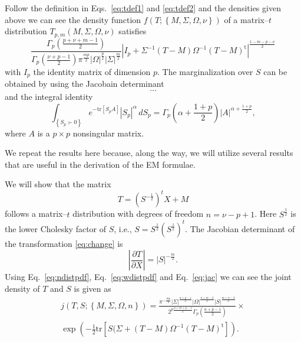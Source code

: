 \documentclass[english,listof=totoc]{scrartcl}
\begin{document}
Follow the definition in Eqs.~\eqref{eq:tdef1} and \eqref{eq:tdef2} and the densities given above we can see the density function $f(T;\left\{M,\Sigma,\Omega,\nu\right\})$ of a matrix--$t$ distribution $T_{p,m}(M,\Sigma,\Omega,\nu)$ satisfies
\begin{equation}
\frac{\Gamma_{p}\left(\frac{p+\nu+m-1}{2}\right)}{\Gamma_{p}\left(\frac{\nu+p-1}{2}\right)\pi^{\frac{mp}{2}}|\Omega|^{\frac{p}{2}}|\Sigma|^{\frac{m}{2}}}
|I_p+\Sigma^{-1}(T-M)\Omega^{-1}(T-M)^{\textrm{t}}|^{\frac{1-m-p-\nu}{2}}
\label{eq:matrixtpdf}
\end{equation}
with $I_p$ the identity matrix of dimension $p$. The marginalization over $S$ can be obtained by using the Jacobain determinant
\begin{equation}
...
\end{equation}
and the integral identity \citep{gupta1999matrix}
\begin{equation}
\int_{\left\{S_p\succ 0\right\}}e^{-\textrm{tr}[S_pA]}|S_p|^{\alpha}\,dS_p=\Gamma_{p}\left(\alpha+\frac{1+p}{2}\right)|A|^{\alpha+\frac{1+p}{2}},\label{eq:intmultgammadef}
\end{equation}
where $A$ is a $p\times p$ nonsingular matrix.

We repeat the results here because, along the way, we will utilize several results that are useful in the derivation of the EM formulae.

We will show that the matrix
\begin{equation}
T=(S^{-\frac{1}{2}})^{t}X+M\label{eq:change}
\end{equation}
follows a matrix--$t$ distribution with degrees of freedom $n=\nu-p+1$. Here $S^{\frac{1}{2}}$ is the lower Cholesky factor of $S$, i.e., $S=S^{\frac{1}{2}}(S^{\frac{1}{2}})^t$. The Jacobian determinant of the transformation \eqref{eq:change} is
\begin{equation}
\left|\frac{\partial T}{\partial X}\right|=|S|^{-\frac{m}{2}}.\label{eq:jac}
\end{equation}
Using Eq.~\eqref{eq:ndistpdf}, Eq.~\eqref{eq:wdistpdf} and Eq.~\eqref{eq:jac} we can see the joint density of $T$ and $S$ is given as
\begin{equation}
\begin{split}j(T,S;\left\{M,\Sigma,\Omega,n\right\})=\frac{\pi^{-\frac{mp}{2}}|\Sigma|^{\frac{n+p-1}{2}}|\Omega|^{\frac{n+m-2}{2}}|S|^{\frac{m+n-2}{2}}}{2^{p\frac{n+m+p-1}{2}}\Gamma_{p}(\frac{n+p-1}{2})}\times\\
\exp\left(-\frac{1}{2}\textrm{tr}\left[S(\Sigma+(T-M)\Omega^{-1}(T-M)^{\textrm{t}}\right]\right).
\end{split}
\label{eq:jointpdf}
\end{equation}
\end{document}
